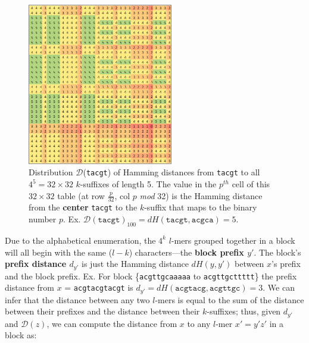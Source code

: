 \documentclass[conference]{IEEEtran}
\begin{document}
\begin{enumerate}[label={\em \arabic*.}]
\begin{figure}[h]
				\centering
				\label{fig:distribution}
				\includegraphics[width=2.5in]{img/D(tacgt)}
				\caption{
					Distribution $\mathcal{D}$(\texttt{tacgt}) of Hamming distances from \texttt{tacgt} 
					to all $4^{5} = 32\times32$ $k$-suffixes of length 5.
					The value in the $p^{th}$ cell of this $32\times32$ table (at row $\frac{p}{32}$, col $p$ \emph{mod} 32) is the Hamming distance from the \textbf{center} \texttt{tacgt} to the $k$-suffix that maps to the binary number $p$.\newline
					Ex. $\mathcal{D}(\texttt{tacgt})_{100} = dH(\texttt{tacgt}, \texttt{acgca}) = 5$.\newline
				}
				\end{figure}\newline
			Due to the alphabetical enumeration, the $4^{k}$ $l$-mers grouped together in a block will all begin with the same ($l-k$) characters---the {\boldmath\bf block prefix $y'$}. The block's {\boldmath\bf prefix distance $d_{y'}$} is just the Hamming distance $dH(y,y')$ between $x$'s prefix and the block prefix.\newline\newline
				{\small
					Ex. For block \{\texttt{acgttgcaaaaa} to \texttt{acgttgcttttt}\}\newline
					\hspace*{18pt} the prefix distance from $x$ = \texttt{acgtacgtacgt} is\newline
					\hspace*{21pt} $d_{y'} = dH(\texttt{acgtacg}, \texttt{acgttgc}) = 3$. } \newline\newline
			We can infer that the distance between any two $l$-mers is equal to the sum of the distance between their prefixes and the distance between their $k$-suffixes; thus, given $d_{y'}$ and $\mathcal{D}(z)$, we can compute the distance from $x$ to any $l$-mer $x' = y'z'$ in a block as:

\end{enumerate}
\end{document}
